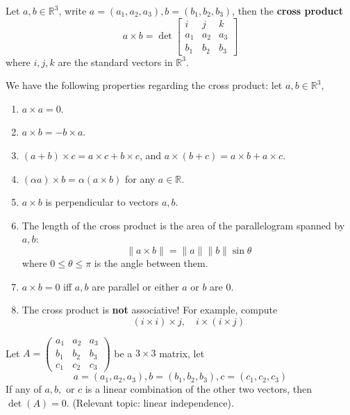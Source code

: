 \documentclass[openany]{book}
\newcommand{\R}{\mathbb{R}}
\begin{document}
\begin{defn}
    Let $a,b\in\R^3$, write $a=(a_1,a_2,a_3), b=(b_1,b_2,b_3)$, then the \textbf{cross product}
    \begin{equation*}
        a\times b=\det\begin{bmatrix}
            i&j&k\\
            a_1&a_2&a_3\\
            b_1&b_2&b_3
        \end{bmatrix}
    \end{equation*}
    where $i,j,k$ are the standard vectors in $\R^3$.
\end{defn}


\begin{prop}
    We have the following properties regarding the cross product: let $a,b\in\R^3$,
    \begin{enumerate}
        \item $a\times a=0$.
        \item $a\times b=-b\times a$.
        \item $(a+b)\times c=a\times c+b\times c$, and $a\times (b+c)=a\times b+a\times c$.
        \item $(\alpha a)\times b=\alpha(a\times b)$ for any $a\in\R$.
        \item $a\times b$ is perpendicular to vectors $a,b$.
        \item The length of the cross product is the area of the parallelogram spanned by $a,b$:
        \begin{equation*}
            \|a\times b\|=\|a\|\|b\|\sin\theta
        \end{equation*}
        where $0\leq\theta\leq\pi$ is the angle between them. 
        \item $a\times b=0$ iff $a,b$ are parallel or either $a$ or $b$ are $0$.
        \item The cross product is \textbf{not} associative! For example, compute 
        \begin{equation*}
            (i\times i)\times j, \quad i\times (i\times j)
        \end{equation*}
    \end{enumerate}
\end{prop}


\begin{prop}\label{det}
    Let $A=\begin{pmatrix}
        a_1&a_2&a_3\\
        b_1&b_2&b_3\\
        c_1&c_2&c_3
    \end{pmatrix}$ be a $3\times 3$ matrix, let 
    \begin{equation*}
        a=(a_1,a_2, a_3), b=(b_1,b_2,b_3), c=(c_1,c_2,c_3)
    \end{equation*}
    If any of $a,b,$ or $c$ is a linear combination of the other two vectors, then $\det(A)=0$. (Relevant topic: linear independence).
\end{prop}
\end{document}
